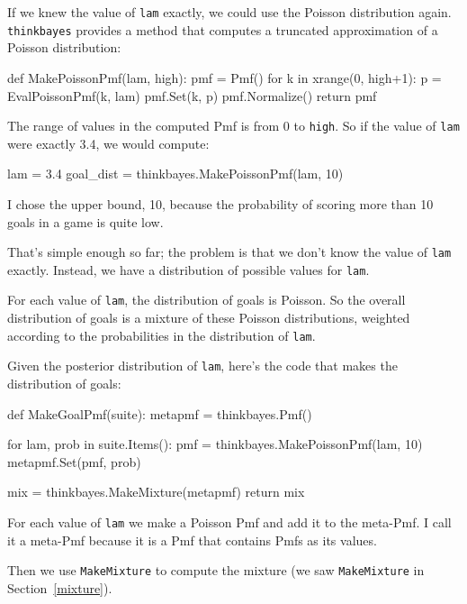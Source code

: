 \documentclass[12pt]{book}
\theoremstyle{exercise}
\begin{document}
If we knew the value of {\tt lam} exactly, we could use the
Poisson distribution again.  \verb"thinkbayes" provides a
method that computes a truncated approximation of a Poisson
distribution:

\begin{code}
def MakePoissonPmf(lam, high):
    pmf = Pmf()
    for k in xrange(0, high+1):
        p = EvalPoissonPmf(k, lam)
        pmf.Set(k, p)
    pmf.Normalize()
    return pmf
\end{code}  

The range of values in the computed Pmf is from 0 to {\tt high}.
So if the value of {\tt lam} were exactly 3.4, we would compute:

\begin{code}
lam = 3.4
goal_dist = thinkbayes.MakePoissonPmf(lam, 10)
\end{code}

I chose the upper bound, 10, because the probability of scoring
more than 10 goals in a game is quite low.

That's simple enough so far; the problem is that we don't know
the value of {\tt lam} exactly.  Instead, we have a distribution
of possible values for {\tt lam}.

For each value of {\tt lam}, the distribution of goals is Poisson.
So the overall distribution of goals is a mixture of these
Poisson distributions, weighted according to the probabilities
in the distribution of {\tt lam}.

Given the posterior distribution of {\tt lam}, here's the code
that makes the distribution of goals:

\begin{code}
def MakeGoalPmf(suite):
    metapmf = thinkbayes.Pmf()

    for lam, prob in suite.Items():
        pmf = thinkbayes.MakePoissonPmf(lam, 10)
        metapmf.Set(pmf, prob)

    mix = thinkbayes.MakeMixture(metapmf)
    return mix
\end{code}  

For each value of {\tt lam} we make a Poisson Pmf and add it to the
meta-Pmf.  I call it a meta-Pmf because it is a Pmf that contains
Pmfs as its values.

Then we use \verb"MakeMixture" to compute the mixture
(we saw {\tt MakeMixture} in Section~\ref{mixture}).
\end{document}
